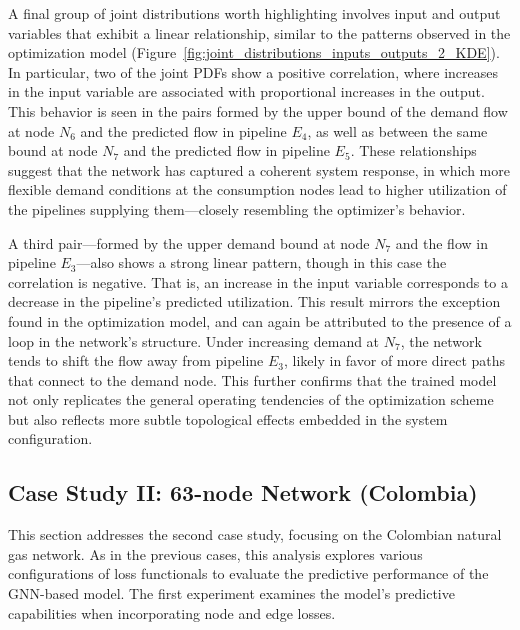 A final group of joint distributions worth highlighting involves input and output variables that exhibit a linear relationship, similar to the patterns observed in the optimization model (Figure~\cref{fig:joint_distributions_inputs_outputs_2_KDE}). In particular, two of the joint PDFs show a positive correlation, where increases in the input variable are associated with proportional increases in the output. This behavior is seen in the pairs formed by the upper bound of the demand flow at node $N_6$ and the predicted flow in pipeline $E_4$, as well as between the same bound at node $N_7$ and the predicted flow in pipeline $E_5$. These relationships suggest that the network has captured a coherent system response, in which more flexible demand conditions at the consumption nodes lead to higher utilization of the pipelines supplying them—closely resembling the optimizer’s behavior.

A third pair—formed by the upper demand bound at node $N_7$ and the flow in pipeline $E_3$—also shows a strong linear pattern, though in this case the correlation is negative. That is, an increase in the input variable corresponds to a decrease in the pipeline’s predicted utilization. This result mirrors the exception found in the optimization model, and can again be attributed to the presence of a loop in the network’s structure. Under increasing demand at $N_7$, the network tends to shift the flow away from pipeline $E_3$, likely in favor of more direct paths that connect to the demand node. This further confirms that the trained model not only replicates the general operating tendencies of the optimization scheme but also reflects more subtle topological effects embedded in the system configuration.
















\subsection{Case Study II: 63-node Network (Colombia)}


This section addresses the second case study, focusing on the Colombian natural gas network. As in the previous cases, this analysis explores various configurations of loss functionals to evaluate the predictive performance of the GNN-based model. The first experiment examines the model's predictive capabilities when incorporating node and edge losses.


